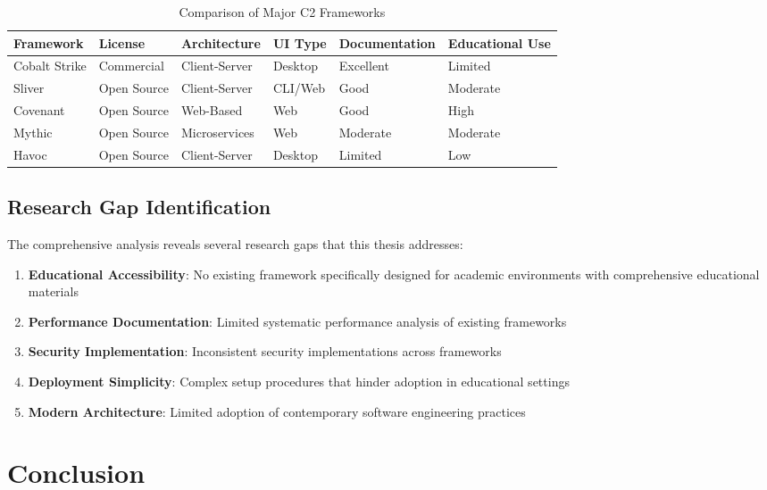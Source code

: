 \begin{table}[htbp]
\centering
\caption{Comparison of Major C2 Frameworks}
\label{tab:framework_comparison}
\begin{tabularx}{\textwidth}{l|X|X|X|X|X}
\toprule
\textbf{Framework} & \textbf{License} & \textbf{Architecture} & \textbf{UI Type} & \textbf{Documentation} & \textbf{Educational Use} \\
\midrule
Cobalt Strike & Commercial & Client-Server & Desktop & Excellent & Limited \\
Sliver & Open Source & Client-Server & CLI/Web & Good & Moderate \\
Covenant & Open Source & Web-Based & Web & Good & High \\
Mythic & Open Source & Microservices & Web & Moderate & Moderate \\
Havoc & Open Source & Client-Server & Desktop & Limited & Low \\
\bottomrule
\end{tabularx}
\end{table}

\subsection{Research Gap Identification}
\label{subsec:research_gaps}

The comprehensive analysis reveals several research gaps that this thesis addresses:

\begin{enumerate}
\item \textbf{Educational Accessibility}: No existing framework specifically designed for academic environments with comprehensive educational materials
\item \textbf{Performance Documentation}: Limited systematic performance analysis of existing frameworks
\item \textbf{Security Implementation}: Inconsistent security implementations across frameworks
\item \textbf{Deployment Simplicity}: Complex setup procedures that hinder adoption in educational settings
\item \textbf{Modern Architecture}: Limited adoption of contemporary software engineering practices
\end{enumerate}

\section{Conclusion}
\label{sec:sota_conclusion}

